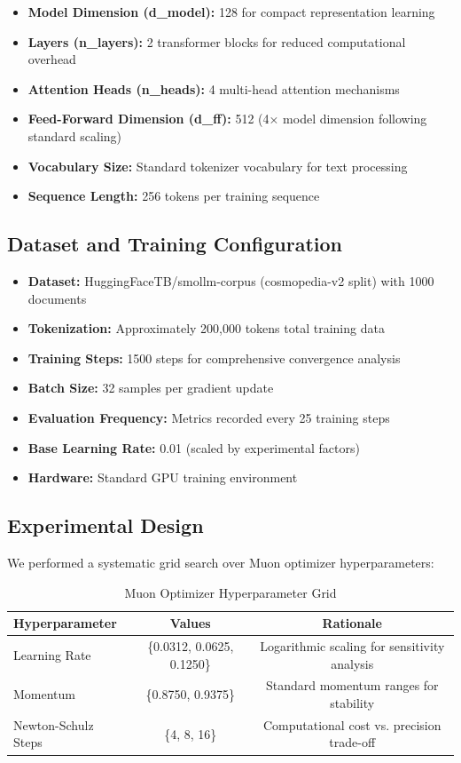 \documentclass[11pt,a4paper]{article}
\begin{document}
\begin{itemize}
    \item \textbf{Model Dimension (d\_model):} 128 for compact representation learning
    \item \textbf{Layers (n\_layers):} 2 transformer blocks for reduced computational overhead
    \item \textbf{Attention Heads (n\_heads):} 4 multi-head attention mechanisms
    \item \textbf{Feed-Forward Dimension (d\_ff):} 512 (4× model dimension following standard scaling)
    \item \textbf{Vocabulary Size:} Standard tokenizer vocabulary for text processing
    \item \textbf{Sequence Length:} 256 tokens per training sequence
\end{itemize}

\subsection{Dataset and Training Configuration}
\begin{itemize}
    \item \textbf{Dataset:} HuggingFaceTB/smollm-corpus (cosmopedia-v2 split) with 1000 documents
    \item \textbf{Tokenization:} Approximately 200,000 tokens total training data
    \item \textbf{Training Steps:} 1500 steps for comprehensive convergence analysis
    \item \textbf{Batch Size:} 32 samples per gradient update
    \item \textbf{Evaluation Frequency:} Metrics recorded every 25 training steps
    \item \textbf{Base Learning Rate:} 0.01 (scaled by experimental factors)
    \item \textbf{Hardware:} Standard GPU training environment
\end{itemize}

\subsection{Experimental Design}
We performed a systematic grid search over Muon optimizer hyperparameters:

\begin{table}[H]
\centering
\caption{Muon Optimizer Hyperparameter Grid}
\label{tab:hyperparameter_grid}
\begin{tabular}{@{}lcc@{}}
\toprule
\textbf{Hyperparameter} & \textbf{Values} & \textbf{Rationale} \\
\midrule
Learning Rate & \{0.0312, 0.0625, 0.1250\} & Logarithmic scaling for sensitivity analysis \\
Momentum & \{0.8750, 0.9375\} & Standard momentum ranges for stability \\
Newton-Schulz Steps & \{4, 8, 16\} & Computational cost vs. precision trade-off \\
\bottomrule
\end{tabular}
\end{table}
\end{document}
